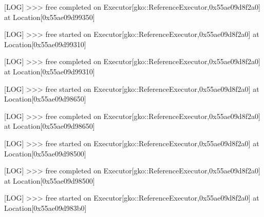 \begin{DoxyCode}
                                                               
[LOG] >>> free completed on Executor[gko::ReferenceExecutor,0x55ae09d8f2a0] at Location[0x55ae09d99350]    
                                                                                                                  
                                                               
[LOG] >>> free started on Executor[gko::ReferenceExecutor,0x55ae09d8f2a0] at Location[0x55ae09d99310]      
                                                                                                                  
                                                               
[LOG] >>> free completed on Executor[gko::ReferenceExecutor,0x55ae09d8f2a0] at Location[0x55ae09d99310]    
                                                                                                                  
                                                               
[LOG] >>> free started on Executor[gko::ReferenceExecutor,0x55ae09d8f2a0] at Location[0x55ae09d98650]      
                                                                                                                  
                                                               
[LOG] >>> free completed on Executor[gko::ReferenceExecutor,0x55ae09d8f2a0] at Location[0x55ae09d98650]    
                                                                                                                  
                                                               
[LOG] >>> free started on Executor[gko::ReferenceExecutor,0x55ae09d8f2a0] at Location[0x55ae09d98500]      
                                                                                                                  
                                                               
[LOG] >>> free completed on Executor[gko::ReferenceExecutor,0x55ae09d8f2a0] at Location[0x55ae09d98500]    
                                                                                                                  
                                                               
[LOG] >>> free started on Executor[gko::ReferenceExecutor,0x55ae09d8f2a0] at Location[0x55ae09d983b0]      
                                                                                                                  

\end{DoxyCode}
